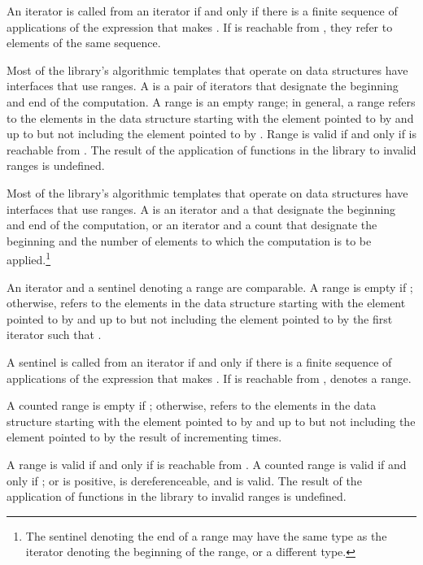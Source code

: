 \begin{removedblock}
\pnum
An iterator
is called
from an iterator
if and only if there is a finite sequence of applications of
the expression
that makes
.
If
is reachable from
,
they refer to elements of the same sequence.

\pnum
Most of the library's algorithmic templates that operate on data structures have interfaces that use ranges.
A
is a pair of iterators that designate the beginning and end of the computation.
A range 
is an empty range;
in general, a range 
refers to the elements in the data structure starting with the element
pointed to by
and up to but not including the element pointed to by
.
Range 
is valid if and only if
is reachable from
.
The result of the application of functions in the library to invalid ranges is
undefined.
\end{removedblock}

\begin{addedblock}
\pnum
Most of the library's algorithmic templates that operate on data structures have
interfaces that use ranges. A  is an iterator and a 
that designate the beginning and end of the computation, or an iterator and a
count that designate the beginning and the number of elements to which the
computation is to be applied.\footnote{The sentinel denoting the end of a range
may have the same type as the iterator denoting the beginning of the range, or a
different type.}

\pnum
An iterator and a sentinel denoting a range are comparable. 
A range 
is empty if ;
otherwise, 
refers to the elements in the data structure starting with the element
pointed to by
and up to but not including the element pointed to by
the first iterator  such that .

\pnum
A sentinel  is called  from an iterator  if
and only if there is a finite sequence of applications of the expression
 that makes . If  is reachable from ,
 denotes a range.

\pnum
A counted range  is empty if ; otherwise, 
refers to the  elements in the data structure starting with the element
pointed to by  and up to but not including the element pointed to by
the result of incrementing   times.

\pnum
A range  is valid if and only if  is reachable from
. A counted range  is valid if and only if ;
or  is positive,  is dereferenceable, and 
is valid. The result of the application of functions in the library to invalid
ranges is undefined.
\end{addedblock}

